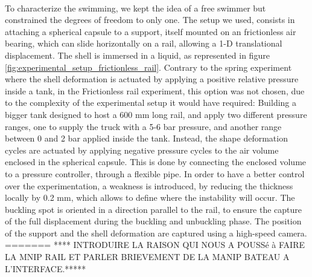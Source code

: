 \paragraph{}
To characterize the swimming, we kept the idea of a free swimmer but constrained the degrees of freedom to only one. The setup we used, consists in attaching a spherical capsule to a support, itself mounted on an frictionless air bearing, which can slide horizontally on a rail, allowing a 1-D translational displacement. The shell is immersed in a liquid, as represented in figure \ref{fig:experimental_setup_frictionless_rail}. Contrary to the spring experiment where the shell deformation is actuated by applying a positive relative pressure inside a tank, in the Frictionless rail experiment, this option was not chosen, due to the complexity of the experimental setup it would have required: Building a bigger tank designed to host a $600$ mm long rail, and apply two different pressure ranges, one to supply the truck with a 5-6 bar pressure, and another range between 0 and 2 bar applied inside the tank. Instead, the shape deformation cycles are actuated by applying negative pressure cycles to the air volume enclosed in the spherical capsule. This is done by connecting the enclosed volume to a pressure controller, through a flexible pipe. In order to have a better control over the experimentation, a weakness is introduced, by reducing the thickness locally by 0.2 mm, which allows to define where the instability will occur. The buckling spot is oriented in a direction parallel to the rail, to ensure the capture of the full displacement during the buckling and unbuckling phase. The position of the support and the shell deformation are captured using a high-speed camera. 
=======
**** INTRODUIRE LA RAISON QUI NOUS A POUSSé à FAIRE LA MNIP RAIL ET PARLER BRIEVEMENT DE LA MANIP BATEAU A L'INTERFACE.*****
